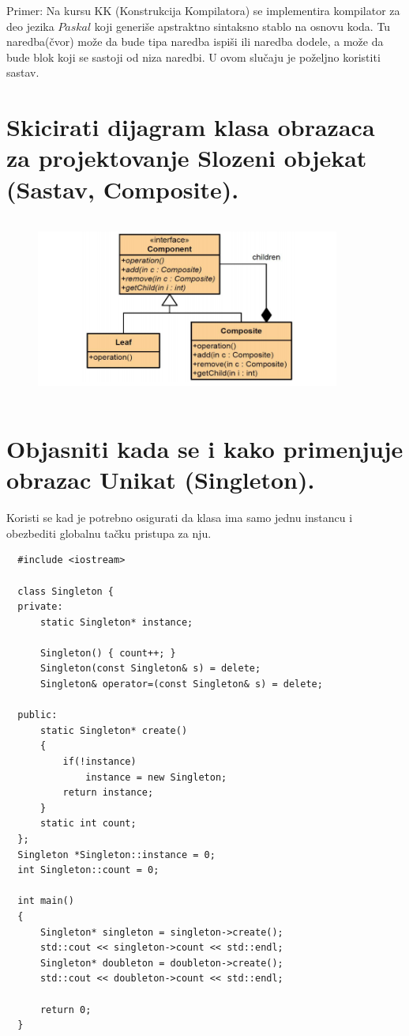 \documentclass[a4paper]{article}
\begin{document}
  Primer: Na kursu KK (Konstrukcija Kompilatora) se implementira kompilator 
  za deo jezika $Paskal$ koji generiše apstraktno sintaksno stablo na osnovu koda. Tu naredba(čvor) 
  može da bude tipa naredba ispiši ili naredba dodele, a može da bude blok koji 
  se sastoji od niza naredbi. U ovom slučaju je poželjno koristiti sastav. 

\section{Skicirati dijagram klasa obrazaca za projektovanje Slozeni objekat (Sastav, Composite).}
  \begin{figure}[H]
    \begin{center}
        \includegraphics[width=100mm,height=60mm]{Slike/dp_composite.png}
    \end{center}
  \end{figure}   

\section{Objasniti kada se i kako primenjuje obrazac Unikat (Singleton).}
  Koristi se kad je potrebno osigurati da klasa ima samo jednu instancu i obezbediti globalnu 
  tačku pristupa za nju.

\begin{lstlisting}
  #include <iostream>

  class Singleton {
  private:
      static Singleton* instance;
  
      Singleton() { count++; }
      Singleton(const Singleton& s) = delete;
      Singleton& operator=(const Singleton& s) = delete;
  
  public:
      static Singleton* create()
      {
          if(!instance)
              instance = new Singleton;
          return instance;
      }
      static int count;
  };
  Singleton *Singleton::instance = 0;
  int Singleton::count = 0;
  
  int main()
  {
      Singleton* singleton = singleton->create();
      std::cout << singleton->count << std::endl;
      Singleton* doubleton = doubleton->create();
      std::cout << doubleton->count << std::endl;
  
      return 0;
  }\end{lstlisting}
\end{document}
